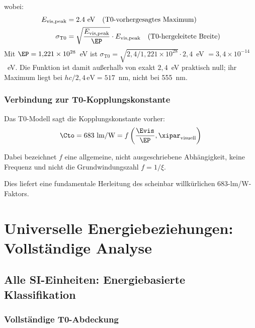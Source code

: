 	wobei:
	\begin{align}
		E_{\text{vis,peak}} &= 2.4 \text{ eV} \quad \text{(T0-vorhergesagtes Maximum)} \\
		\sigma_{\text{T0}} &= \sqrt{\frac{E_{\text{vis,peak}}}{\EP}} \cdot E_{\text{vis,peak}} \quad \text{(T0-hergeleitete Breite)}
	\end{align}
	Mit $\EP = 1{,}221\times10^{28}$~eV ist $\sigma_{\text{T0}} = \sqrt{2{,}4/1{,}221\times10^{28}} \cdot 2{,}4$~eV $= 3{,}4\times10^{-14}$~eV. Die Funktion ist damit außerhalb von exakt $2{,}4$~eV praktisch null; ihr Maximum liegt bei $hc/2{,}4\,\text{eV} = 517$~nm, nicht bei 555~nm.
	
	\subsubsection{Verbindung zur T0-Kopplungskonstante}
	\label{subsubsec:t0_kopplungskonstante}
	
	Das T0-Modell sagt die Kopplungskonstante vorher:
	\begin{equation}
		\Cto = 683 \text{ lm/W} = f\left(\frac{\Evis}{\EP}, \xipar_{\text{visuell}}\right)
		\label{eq:t0_kopplungsvorhersage}
	\end{equation}

	Dabei bezeichnet $f$ eine allgemeine, nicht ausgeschriebene Abhängigkeit, keine Frequenz und nicht die Grundwindungszahl $f = 1/\xi$.

	Dies liefert eine fundamentale Herleitung des scheinbar willkürlichen 683-lm/W-Faktors.
	
	\section{Universelle Energiebeziehungen: Vollständige Analyse}
	\label{sec:universelle_energiebeziehungen}
	
	\subsection{Alle SI-Einheiten: Energiebasierte Klassifikation}
	\label{subsec:alle_si_energiebasiert}
	
	\subsubsection{Vollständige T0-Abdeckung}
	\label{subsubsec:vollstaendige_t0_abdeckung}
	
